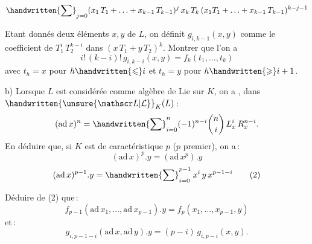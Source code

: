 \[
\mathop{\handwritten{\sum}}\nolimits_{j=0}
(x_1\,T_1+\ldots+x_{k-1}\,T_{k-1})^j\,x_k\,T_k\,
(x_1 T_1+\ldots+x_{k-1}\,T_{k-1})^{k-j-1}
\]

Etant donnés deux éléments $x,y$ de $L$, on définit $g_{i,k-1}(x,y)$ comme le coefficient de $T_1^i\,T_2^{k-i}$ dans $(x\,T_1+y\,T_2)^k$. Montrer que l'on a
\[
i!\,(k-i)!\,g_{i,k-i}(x,y)=f_k(t_1,\ldots,t_k)
\]
avec $t_h=x$ pour $h\handwritten{\leqslant}i$ et $t_h=y$ pour $h\handwritten{\geqslant}i+1$.

b) Lorsque $L$ est considérée comme algèbre de Lie sur $K$, on a , dans $\handwritten{\unsure{\mathscr L|\mathcal L}}_K(L)$\,:
\[
(\mathrm{ad}\,x)^n=\mathop{\handwritten{\sum}}\nolimits_{i=0}^{n}
(-1)^{n-i}\binom{n}{i}\,L_x^i\,R_x^{n-i}.
\]
En déduire que, si $K$ est de caractéristique $p$ ($p$ premier), on a\,:
\begingroup
\makeatletter
\tagsleft@true
\makeatother
\[
(\mathrm{ad}\,x)^p.y=(\mathrm{ad}\,x^p).y
\tag*{(1)}
\]
\[
(\mathrm{ad}\,x)^{p-1}.y=\mathop{\handwritten{\sum}}\nolimits_{i=0}^{p-1}x^i\,y\,x^{p-1-i}
\tag*{(2)}
\]
\endgroup

Déduire de (2) que\,:
\[
f_{p-1}(\mathrm{ad}\,x_1,\ldots,\mathrm{ad}\,x_{p-1}).y=f_p(x_1,\ldots,x_{p-1},y)
\]
et\,:
\[
g_{i,p-1-i}(\mathrm{ad}\,x,\mathrm{ad}\,y).y=(p-i)\,g_{i,p-i}(x,y).
\]
